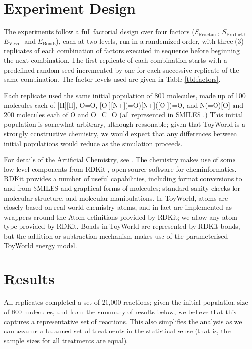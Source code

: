 \section{Experiment Design}
The experiments follow a full factorial design over four factors ($S_\mathrm{Reactant}$, $S_\mathrm{Product}$, $E_\mathrm{Vessel}$ and $E_\mathrm{Bonds}$), each at two levels, run in a randomized order, with three (3) replicates of each combination of factors executed in sequence before beginning the next combination. The first replicate of each combination starts with a predefined random seed incremented by one for each successive replicate of the same combination. The factor levels used are given in Table \cref{tbl:factors}.

Each replicate used the same initial population of 800 molecules, made up of 100 molecules each of [H][H], O=O, [O-][N+](=O)[N+]([O-])=O, and N(=O)[O] and 200 molecules each of O and O=C=O (all represented in SMILES \parencite{smiles}.) This initial population is somewhat arbitrary, although reasonable; given that ToyWorld is a strongly constructive chemistry, we would expect that any differences between initial populations would reduce as the simulation proceeds.

For details of the Artificial Chemistry, see \parencite{Young2013}. The chemistry makes use of some low-level components from RDKit \parencite{rdkit}, open-source software for cheminformatics. RDKit provides a number of useful capabilities, including format conversions to and from SMILES and graphical forms of molecules; standard sanity checks for molecular structure, and molecular manipulations. In ToyWorld, atoms are closely based on real-world chemistry atoms, and in fact are implemented as wrappers around the Atom definitions provided by RDKit; we allow any atom type provided by RDKit. Bonds in ToyWorld are represented by RDKit bonds, but the addition or subtraction mechanism makes use of the parameterised ToyWorld energy model.

\section{Results}
All replicates completed a set of 20,000 reactions; given the initial population size of 800 molecules, and from the summary of results below, we believe that this captures a representative set of reactions. This also simplifies the analysis as we can assume a balanced set of treatments in the statistical sense (that is, the sample sizes for all treatments are equal).

